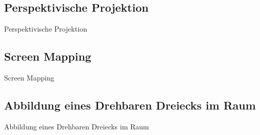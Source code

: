 \documentclass[10pt,aspectratio=169]{beamer}
\begin{document}
  \subsection{Perspektivische Projektion}
  \begin{frame}{Perspektivische Projektion}
  \end{frame}


  \subsection{Screen Mapping}
  \begin{frame}{Screen Mapping}
  \end{frame}

  \subsection{Abbildung eines Drehbaren Dreiecks im Raum}
  \begin{frame}{Abbildung eines Drehbaren Dreiecks im Raum}
  \end{frame}
\end{document}
